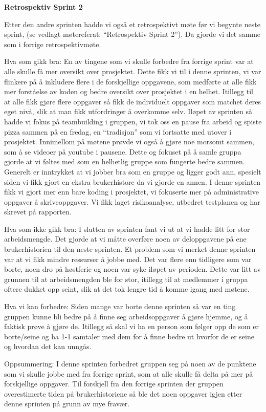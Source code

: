 \documentclass[12pt,a4paper,norsk]{article}
\begin{document}
\bigskip \noindent \textbf{Retrospektiv Sprint 2}
\par Etter den andre sprinten hadde vi også et retrospektivt møte før vi begynte neste sprint, (se vedlagt møtereferat: “Retrospektiv Sprint 2”). Da gjorde vi det samme som i forrige retrospektivmøte.

Hva som gikk bra:
En av tingene som vi skulle forbedre fra forrige sprint var at alle skulle få mer oversikt over prosjektet. Dette fikk vi til i denne sprinten, vi var flinkere på å inkludere flere i de forskjellige oppgavene, som medførte at alle fikk mer forståelse av koden og bedre oversikt over prosjektet i en helhet. Itillegg til at alle fikk gjøre flere oppgaver så fikk de individuelt oppgaver som matchet deres eget nivå, slik at man fikk utfordringer å overkomme selv.
Iløpet av sprinten så hadde vi fokus på teambuilding i gruppen, vi tok oss en pause fra arbeid og spiste pizza sammen på en fredag, en “tradisjon” som vi fortsatte med utover i prosjektet. Innimellom på møtene prøvde vi også å gjøre noe morsomt sammen, som å se videoer på youtube i pausene. Dette og fokuset på å samle gruppa gjorde at vi føltes med som en helhetlig gruppe som fungerte bedre sammen. 
Generelt er inntrykket at vi jobber bra som en gruppe og ligger godt ann, spesielt siden vi fikk gjort en ekstra brukerhistore da vi gjorde en annen. 
I denne sprinten fikk vi gjort mer enn bare koding i prosjektet, vi fokuserte mer på administrative oppgaver å skriveoppgaver. Vi fikk laget risikoanalyse, utbedret testplanen og har skrevet på rapporten. 

Hva som ikke gikk bra:
I slutten av sprinten fant vi ut at vi hadde litt for stor arbeidsmengde. Det gjorde at vi måtte overføre noen av deloppgavene på ene brukerhistorien til den neste sprinten. 
Et problem som vi merket denne sprinten var at vi fikk mindre ressurser å jobbe med. Det var flere enn tidligere som var borte, noen dro på høstferie og noen var syke iløpet av perioden. Dette var litt av grunnen til at arbeidsmengden ble for stor, itillegg til at medlemmer i gruppa oftere dukket opp seint, slik at det tok lengre tid å komme igang med møtene. 

Hva vi kan forbedre:
Siden mange var borte denne sprinten så var en ting gruppen kunne bli bedre på å finne seg arbeidsoppgaver å gjøre hjemme, og å faktisk prøve å gjøre de.
Itillegg så skal vi ha en person som følger opp de som er borte/seine og ha 1-1 samtaler med dem for å finne bedre ut hvorfor de er seine og hvordan det kan unngås. 

Oppsummering:
I denne sprinten forbedret gruppen seg på noen av de punktene som vi skulle jobbe med fra forrige sprint, som at alle skulle få delta på mer på forskjellige oppgaver. Til forskjell fra den forrige sprinten der gruppen overestimerte tiden på brukerhistoriene så ble det noen oppgaver igjen etter denne sprinten på grunn av mye fravær. 
\end{document}
